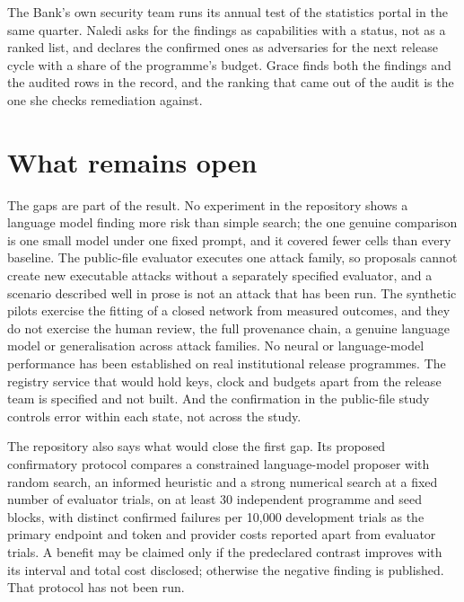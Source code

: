The Bank's own security team runs its annual test of the statistics portal in the same
quarter. Naledi asks for the findings as capabilities with a status, not as a ranked
list, and declares the confirmed ones as adversaries for the next release cycle with a
share of the programme's budget. Grace finds both the findings and the audited rows in
the record, and the ranking that came out of the audit is the one she checks
remediation against.

\section{What remains open}\label{c14:sec-open}

The gaps are part of the result. No experiment in the repository shows a language model
finding more risk than simple search; the one genuine comparison is one small model
under one fixed prompt, and it covered fewer cells than every baseline. The public-file
evaluator executes one attack family, so proposals cannot create new executable attacks
without a separately specified evaluator, and a scenario described well in prose is not
an attack that has been run. The synthetic pilots exercise the fitting of a closed
network from measured outcomes, and they do not exercise the human review, the full
provenance chain, a genuine language model or generalisation across attack families. No
neural or language-model performance has been established on real institutional release
programmes. The registry service that would hold keys, clock and budgets apart from the
release team is specified and not built. And the confirmation in the public-file study
controls error within each state, not across the study.

The repository also says what would close the first gap. Its proposed confirmatory
protocol compares a constrained language-model proposer with random search, an informed
heuristic and a strong numerical search at a fixed number of evaluator trials, on at
least 30 independent programme and seed blocks, with distinct confirmed failures per
10{,}000 development trials as the primary endpoint and token and provider costs
reported apart from evaluator trials. A benefit may be claimed only if the predeclared
contrast improves with its interval and total cost disclosed; otherwise the negative
finding is published. That protocol has not been run.

